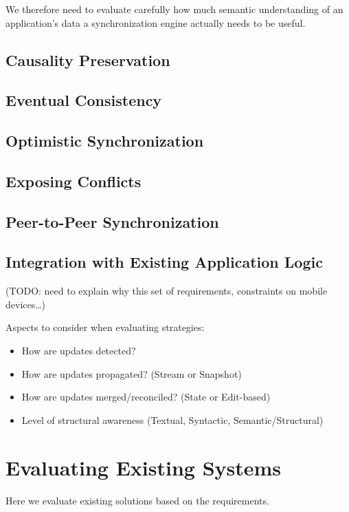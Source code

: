 We therefore need to evaluate carefully how much semantic understanding of an application's data a synchronization engine actually needs to be useful.

\subsection{Causality Preservation}


\subsection{Eventual Consistency}

\subsection{Optimistic Synchronization}

\subsection{Exposing Conflicts}

\subsection{Peer-to-Peer Synchronization}

\subsection{Integration with Existing Application Logic}


(TODO: need to explain why this set of requirements, constraints on
mobile devices\ldots{})

Aspects to consider when evaluating strategies:

\begin{itemize}
\item How are updates detected?
\item How are updates propagated? (Stream or Snapshot)
\item How are updates merged/reconciled? (State or Edit-based)
\item Level of structural awareness (Textual, Syntactic, Semantic/Structural)
\end{itemize}

\section{Evaluating Existing Systems}
Here we evaluate existing solutions based on the requirements.


